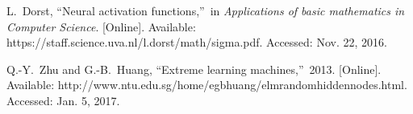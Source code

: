 \documentclass[journal,comsoc]{IEEEtran}
\begin{document}
\begin{thebibliography}{1}
 L.~Dorst, \textquotedblleft Neural activation functions,\textquotedblright \ in {\it Applications of basic mathematics in Computer Science}. [Online]. Available: https://staff.science.uva.nl/l.dorst/math/sigma.pdf. Accessed: Nov. 22, 2016.

Q.-Y.~Zhu and G.-B.~Huang, \textquotedblleft Extreme learning machines,\textquotedblright \ 2013. [Online]. Available: http://www.ntu.edu.sg/home/egbhuang/elm\textunderscore random\textunderscore hidden\textunderscore nodes.html. Accessed: Jan. 5, 2017.

\end{thebibliography}

% 










\end{document}
